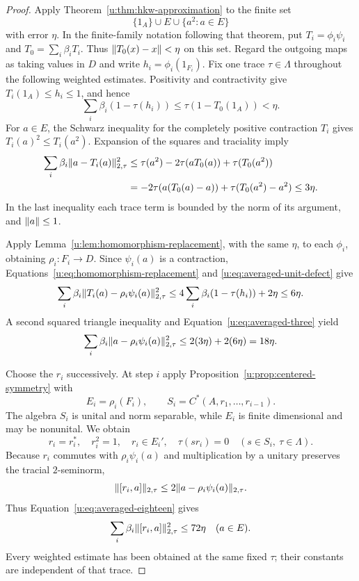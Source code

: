 \begin{proof}
Apply Theorem~\ref{u:thm:hkw-approximation} to the finite set
\[
 \{1_A\}\cup E\cup\{a^2:a\in E\}
\]
with error $\eta$.  In the finite-family notation following that theorem,
put $T_i=\phi_i\psi_i$ and $T_0=\sum_i\beta_iT_i$.  Thus
$\lVert T_0(x)-x\rVert<\eta$ on this set.  Regard the outgoing maps as taking
values in $D$ and write $h_i=\phi_i(1_{F_i})$.  Fix one trace
$\tau\in\Lambda$ throughout the following weighted estimates.  Positivity
and contractivity give $T_i(1_A)\le h_i\le1$, and hence
\begin{equation}
 \sum_i\beta_i(1-\tau(h_i))
 \le\tau(1-T_0(1_A))<\eta.
 \label{u:eq:averaged-unit-defect}
\end{equation}
For $a\in E$, the Schwarz inequality for the completely positive
contraction $T_i$ gives $T_i(a)^2\le T_i(a^2)$.  Expansion of the squares
and traciality imply
\begin{align}
 \sum_i\beta_i\lVert a-T_i(a)\rVert_{2,\tau}^{2}
 &\le\tau(a^2)-2\tau(aT_0(a))+\tau(T_0(a^2))\notag\\
 &= -2\tau(a(T_0(a)-a))+\tau(T_0(a^2)-a^2)
 \le3\eta.
 \label{u:eq:averaged-three}
\end{align}
In the last inequality each trace term is bounded by the norm of its
argument, and $\lVert a\rVert\le1$.

Apply Lemma~\ref{u:lem:homomorphism-replacement}, with the same $\eta$,
to each $\phi_i$, obtaining $\rho_i:F_i\to D$.  Since $\psi_i(a)$ is a
contraction, Equations~\eqref{u:eq:homomorphism-replacement} and
\eqref{u:eq:averaged-unit-defect} give
\[
 \sum_i\beta_i
 \lVert T_i(a)-\rho_i\psi_i(a)\rVert_{2,\tau}^{2}
 \le4\sum_i\beta_i(1-\tau(h_i))+2\eta\le6\eta.
\]
A second squared triangle inequality and
Equation~\eqref{u:eq:averaged-three} yield
\begin{equation}
 \sum_i\beta_i\lVert a-\rho_i\psi_i(a)\rVert_{2,\tau}^{2}
 \le2(3\eta)+2(6\eta)=18\eta.
 \label{u:eq:averaged-eighteen}
\end{equation}

Choose the $r_i$ successively.  At step $i$ apply
Proposition~\ref{u:prop:centered-symmetry} with
\[
 E_i=\rho_i(F_i),\qquad S_i=C^*(A,r_1,\ldots,r_{i-1}).
\]
The algebra $S_i$ is unital and norm separable, while $E_i$ is finite
dimensional and may be nonunital.  We obtain
\begin{equation}
 r_i=r_i^*,\quad r_i^2=1,\quad r_i\in E_i',\quad
 \tau(sr_i)=0\quad(s\in S_i,\ \tau\in\Lambda).
 \label{u:eq:successive-centering}
\end{equation}
Because $r_i$ commutes with $\rho_i\psi_i(a)$ and multiplication by a
unitary preserves the tracial $2$-seminorm,
\[
 \lVert[r_i,a]\rVert_{2,\tau}
 \le2\lVert a-\rho_i\psi_i(a)\rVert_{2,\tau}.
\]
Thus Equation~\eqref{u:eq:averaged-eighteen} gives
\begin{equation}
 \sum_i\beta_i\lVert[r_i,a]\rVert_{2,\tau}^2\le72\eta
 \quad(a\in E).
 \label{u:eq:averaged-seventytwo}
\end{equation}
Every weighted estimate has been obtained at the same fixed $\tau$;
their constants are independent of that trace.


\end{proof}
